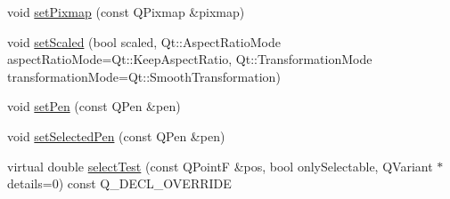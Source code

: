 \begin{DoxyCompactItemize}
\item 
void \hyperlink{classQCPItemPixmap_a726b69ea4025edf48f9b29b6450548a7}{set\+Pixmap} (const Q\+Pixmap \&pixmap)
\item 
void \hyperlink{classQCPItemPixmap_ab4d44529a1c6c8d37d0ea7560e042777}{set\+Scaled} (bool scaled, Qt\+::\+Aspect\+Ratio\+Mode aspect\+Ratio\+Mode=Qt\+::\+Keep\+Aspect\+Ratio, Qt\+::\+Transformation\+Mode transformation\+Mode=Qt\+::\+Smooth\+Transformation)
\item 
void \hyperlink{classQCPItemPixmap_acdade1305edb4b5cae14f97fd132065f}{set\+Pen} (const Q\+Pen \&pen)
\item 
void \hyperlink{classQCPItemPixmap_afc5e479e88e53740176ce77cb70dd67a}{set\+Selected\+Pen} (const Q\+Pen \&pen)
\item 
virtual double \hyperlink{classQCPItemPixmap_a65d1ede7bb479b90d40186d083071947}{select\+Test} (const Q\+PointF \&pos, bool only\+Selectable, Q\+Variant $\ast$details=0) const Q\+\_\+\+D\+E\+C\+L\+\_\+\+O\+V\+E\+R\+R\+I\+DE
\end{DoxyCompactItemize}
